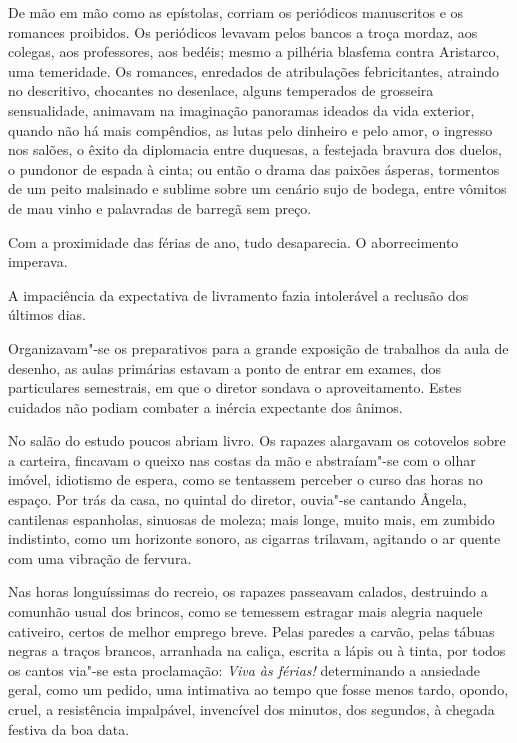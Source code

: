 De mão em mão como as
epístolas, corriam os periódicos manuscritos e os romances proibidos.
Os periódicos levavam pelos bancos a troça mordaz, aos colegas, aos
professores, aos bedéis; mesmo a pilhéria blasfema contra Aristarco,
uma temeridade. Os romances, enredados de atribulações febricitantes,
atraindo no descritivo, chocantes no desenlace, alguns temperados de
grosseira sensualidade, animavam na imaginação panoramas ideados da
vida exterior, quando não há mais compêndios, as lutas pelo dinheiro e
pelo amor, o ingresso nos salões, o êxito da diplomacia entre duquesas,
a festejada bravura dos duelos, o pundonor de espada à cinta; ou então
o drama das paixões ásperas, tormentos de um peito malsinado e sublime
sobre um cenário sujo de bodega, entre vômitos de mau vinho e
palavradas de barregã sem preço. 

Com a proximidade das férias de ano,
tudo desaparecia. O aborrecimento imperava. 

A impaciência da
expectativa de livramento fazia intolerável a reclusão dos últimos
dias. 

Organizavam"-se os preparativos para a grande exposição de
trabalhos da aula de desenho, as aulas primárias estavam a ponto de
entrar em exames, dos particulares semestrais, em que o diretor sondava
o aproveitamento. Estes cuidados não podiam combater a inércia
expectante dos ânimos. 

No salão do estudo poucos abriam livro. Os
rapazes alargavam os cotovelos sobre a carteira, fincavam o queixo nas
costas da mão e abstraíam"-se com o olhar imóvel, idiotismo de espera,
como se tentassem perceber o curso das horas no espaço. Por trás da
casa, no quintal do diretor, ouvia"-se cantando Ângela, cantilenas
espanholas, sinuosas de moleza; mais longe, muito mais, em zumbido
indistinto, como um horizonte sonoro, as cigarras trilavam, agitando o
ar quente com uma vibração de fervura. 

Nas horas longuíssimas do
recreio, os rapazes passeavam calados, destruindo a comunhão usual dos
brincos, como se temessem estragar mais alegria naquele cativeiro,
certos de melhor emprego breve. Pelas paredes a carvão, pelas tábuas
negras a traços brancos, arranhada na caliça, escrita a lápis ou à
tinta, por todos os cantos via"-se esta proclamação: \textit{Viva às férias!}
determinando a ansiedade geral, como um pedido, uma intimativa ao tempo
que fosse menos tardo, opondo, cruel, a resistência impalpável,
invencível dos minutos, dos segundos, à chegada festiva da boa data.

